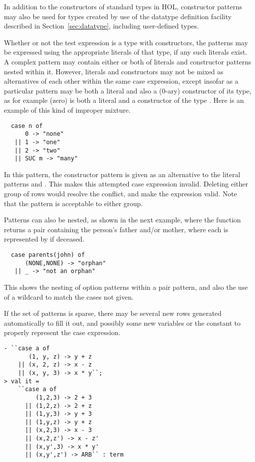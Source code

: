 In addition to the constructors of standard types in HOL{},
constructor patterns may also be used for types created by use of the
datatype definition facility described in Section~\ref{sec:datatype},
including user-defined types.

Whether or not the test expression is a type with constructors,
the patterns may be expressed using the appropriate literals of that type,
if any such literals exist.
A complex pattern may contain either or both of literals and constructor
patterns nested within it.
However, literals and constructors may not be mixed as alternatives of
each other within the same case expression,
except insofar as a particular pattern may be both a literal
and also a (0-ary) constructor of its type, as for example  (zero)
is both a literal and a constructor of the type .
Here is an example of this kind of improper mixture.
%
\begin{hol}
\begin{verbatim}
  case n of
      0 -> "none"
   || 1 -> "one"
   || 2 -> "two"
   || SUC m -> "many"
\end{verbatim}
\end{hol}
%
In this pattern, the constructor pattern  is given as
an alternative to the literal patterns  and .
This makes this attempted case expression invalid.
Deleting either group of rows would resolve the conflict,
and make the expression valid.
Note that the pattern  is acceptable to either group.

Patterns can also be nested, as shown in the next example, where
the function  returns a pair containing the person's father
and/or mother, where each is represented by  if deceased.
%
\begin{hol}
\begin{verbatim}
  case parents(john) of
      (NONE,NONE) -> "orphan"
   || _ -> "not an orphan"
\end{verbatim}
\end{hol}
%
This shows the nesting of option patterns within a pair pattern,
and also the use of a wildcard \ml{\_} to match the cases not given.

If the set of patterns is sparse, there may be several new rows generated
automatically to fill it out, and possibly some new variables or the
 constant to properly represent the case expression.
%
\begin{hol}
\begin{verbatim}
- ``case a of
       (1, y, z) -> y + z
    || (x, 2, z) -> x - z
    || (x, y, 3) -> x * y``;
> val it =
    ``case a of
         (1,2,3) -> 2 + 3
      || (1,2,z) -> 2 + z
      || (1,y,3) -> y + 3
      || (1,y,z) -> y + z
      || (x,2,3) -> x - 3
      || (x,2,z') -> x - z'
      || (x,y',3) -> x * y'
      || (x,y',z') -> ARB`` : term
\end{verbatim}
\end{hol}

